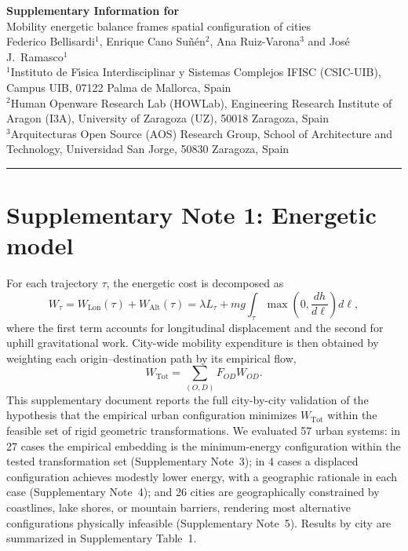 \documentclass[11pt]{article}
\begin{document}
\begin{center}
{\Large\bfseries Supplementary Information for}\\[8pt]
{\large Mobility energetic balance frames spatial configuration of cities}\\[6pt]
{\normalsize Federico Bellisardi$^1$, Enrique Cano Su\~n\'en$^2$, Ana Ruiz-Varona$^3$ and Jos\'e J.\ Ramasco$^1$}\\ \vspace{.8cm}
{\small $^1$Instituto de F\'{\i}sica Interdisciplinar y Sistemas Complejos IFISC (CSIC-UIB), Campus UIB, 07122 Palma de Mallorca, Spain \\$^2$Human Openware Research Lab (HOWLab), Engineering Research Institute of Aragon (I3A), University of Zaragoza (UZ), 50018 Zaragoza, Spain \\ $^3$Arquitecturas Open Source (AOS) Research Group, School of Architecture and Technology, Universidad San Jorge, 50830 Zaragoza, Spain }
\end{center}

\vspace{6pt}\hrule\vspace{10pt}

\section*{Supplementary Note 1: Energetic model}

For each trajectory $\tau$, the energetic cost is decomposed as
\[
W_\tau = W_{\mathrm{Lon}}(\tau) + W_{\mathrm{Alt}}(\tau)
= \lambda L_\tau + m g \int_\tau \max\!\left(0,\frac{dh}{d\ell}\right)d\ell,
\]
where the first term accounts for longitudinal displacement and the second for uphill gravitational work. City-wide mobility expenditure is then obtained by weighting each origin--destination path by its empirical flow,
\[
W_{\mathrm{Tot}} = \sum_{(O,D)} F_{OD} W_{OD}.
\]
This supplementary document reports the full city-by-city validation of the hypothesis that the empirical urban configuration minimizes $W_{\mathrm{Tot}}$ within the feasible set of rigid geometric transformations. We evaluated 57 urban systems: in 27 cases the empirical embedding is the minimum-energy configuration within the tested transformation set (Supplementary Note~3); in 4 cases a displaced configuration achieves modestly lower energy, with a geographic rationale in each case (Supplementary Note~4); and 26 cities are geographically constrained by coastlines, lake shores, or mountain barriers, rendering most alternative configurations physically infeasible (Supplementary Note~5). Results by city are summarized in Supplementary Table~1.
\end{document}
